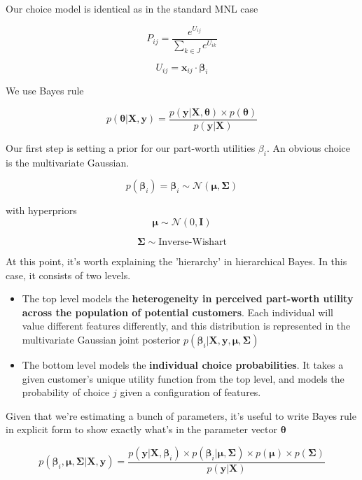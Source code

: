 \documentclass{article}
\begin{document}
Our choice model is identical as in the standard MNL case

\[
P_{ij} = \frac{e^{U_{ij}}}{\sum_{k \in J} e^{U_{ik}}}
\]


\[
U_{ij} = \mathbf{x}_{ij} \cdot \boldsymbol{\beta}_i
\]

We use Bayes rule

\[
p(\boldsymbol{\theta} | \mathbf{X}, \mathbf{y}) = \frac{p(\mathbf{y} | \mathbf{X}, \boldsymbol{\theta}) \times p(\boldsymbol{\theta})}{p(\mathbf{y} | \mathbf{X})}
\]

Our first step is setting a prior for our part-worth utilities $\beta_i$. An obvious choice is the multivariate Gaussian.

\[
p(\boldsymbol{\beta}_i) = \boldsymbol{\beta}_i \sim \mathcal{N}(\boldsymbol{\mu}, \boldsymbol{\Sigma})
\]

with hyperpriors 
\[
\boldsymbol{\mu} \sim \mathcal{N}(0, \mathbf{I})
\]

\[
\boldsymbol{\Sigma} \sim \text{Inverse-Wishart}
\]

At this point, it's worth explaining the 'hierarchy' in hierarchical Bayes. In this case, it consists of two levels. 

\begin{itemize}
\item The top level models the \textbf{heterogeneity in perceived part-worth utility across the population of potential customers}. Each individual will value different features differently, and this distribution is represented in the multivariate Gaussian joint posterior $p(\boldsymbol{\beta}_i | \mathbf{X}, \mathbf{y}, \boldsymbol{\mu}, \boldsymbol{\Sigma})$
  \item The bottom level models the \textbf{individual choice probabilities}. It takes a given customer's unique utility function from the top level, and models the probability of choice $j$ given a configuration of features.
\end{itemize}


Given that we're estimating a bunch of parameters, it's useful to write Bayes rule in explicit form to show exactly what's in the  parameter vector $\boldsymbol{\theta}$

\[
p(\boldsymbol{\beta}_i, \boldsymbol{\mu}, \boldsymbol{\Sigma} | \mathbf{X}, \mathbf{y}) = \frac{p(\mathbf{y} | \mathbf{X}, \boldsymbol{\beta}_i) \times p(\boldsymbol{\beta}_i | \boldsymbol{\mu}, \boldsymbol{\Sigma}) \times p(\boldsymbol{\mu}) \times p(\boldsymbol{\Sigma})}{p(\mathbf{y} | \mathbf{X})}
\]
\end{document}
